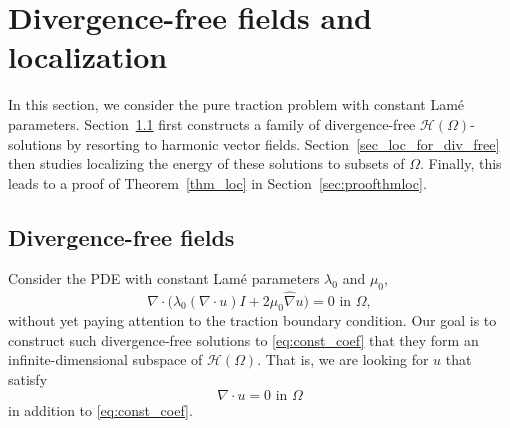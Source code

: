 \documentclass[reqno]{amsart}
\numberwithin{equation}{section}
\numberwithin{figure}{section}
\numberwithin{table}{section}
\theoremstyle{definition}
\theoremstyle{plain}
\theoremstyle{definition}
\theoremstyle{remark}
\numberwithin{equation}{section}
\begin{document}
\section{Divergence-free fields and localization} \label{sec:divergence_free}

In this section, we consider the pure traction problem with constant Lam\'e parameters. Section~\ref{sec_div_free_fields} first constructs a family of divergence-free $\mathcal H(\Omega)$-solutions by resorting to harmonic vector fields. Section~\ref{sec_loc_for_div_free} then studies localizing the energy of these solutions to subsets of $\Omega$. Finally, this leads to a proof of Theorem~\ref{thm_loc} in Section~\ref{sec:proofthmloc}.

\subsection{Divergence-free fields} \label{sec_div_free_fields} 

Consider the PDE with constant Lam\'e parameters $\lambda_0$ and $\mu_0$, 
%
\begin{equation} \label{eq:const_coef}
	\nabla \cdot \big(\lambda_0 (\nabla \cdot u) I + 2 \mu_0 \widehat{\nabla} u  \big) = 0 \text{ in } \Omega,
\end{equation}
%
without yet paying attention to the traction boundary condition. Our goal is to construct such divergence-free solutions to \eqref{eq:const_coef} that they form an infinite-dimensional subspace of $\mathcal{H}(\Omega)$. That is, we are looking for $u$ that satisfy 
%
\begin{equation} \label{eq:div_free}
	\nabla \cdot u = 0 \text{ in } \Omega
\end{equation}
%
in addition to \eqref{eq:const_coef}.
\end{document}

